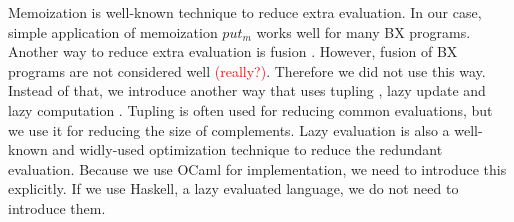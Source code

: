 Memoization \cite{Bellman:2003:DP:862270,MICHIE1968} is well-known technique to reduce extra evaluation. In our case, simple application of memoization $put_m$ works well for many BX programs.
Another way to reduce extra evaluation is fusion \cite{Wadler:1988:DTP:80099.80104}. However, fusion of BX programs are not considered well \textcolor{red}{(really?)}. Therefore we did not use this way.
  Instead of that, we introduce another way that uses tupling \cite{Fokkinga90}, lazy update and lazy computation \cite{Henderson:1976:LE:800168.811543, Hudak:2007:HHL:1238844.1238856}. Tupling is often used for reducing common evaluations, but we use it for reducing the size of complements.
  Lazy evaluation is also a well-known and widly-used optimization technique to reduce the redundant evaluation. Because we use OCaml for implementation, we need to introduce this explicitly. If we use Haskell, a lazy evaluated language, we do not need to introduce them.






